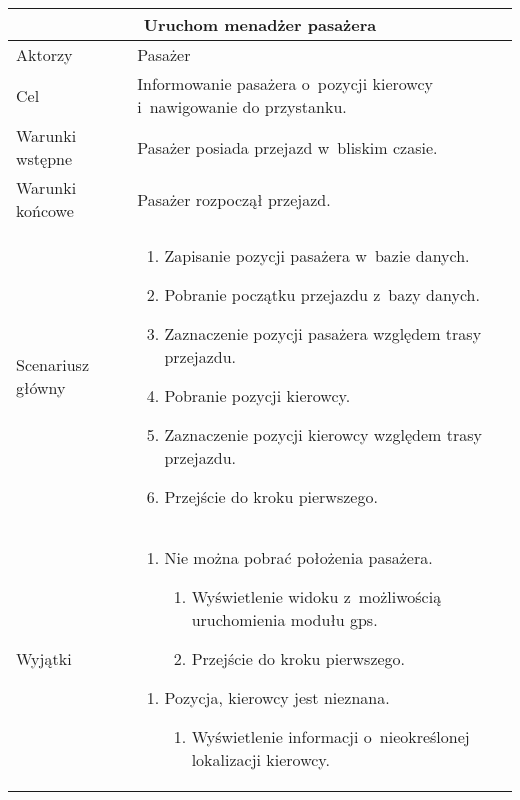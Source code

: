 \documentclass[eng,archivemode]{mgr}
\begin{document}
\newline
\vspace*{1 cm}
\newline
\begin{tabularx}{1\linewidth}{l|X}
	\multicolumn{2}{c}{\textbf{Uruchom menadżer pasażera}} \\ \hline
	Aktorzy & Pasażer\\ \hline
	Cel &  Informowanie pasażera o~pozycji kierowcy i~nawigowanie do przystanku. \\ \hline
	Warunki wstępne & Pasażer posiada przejazd w~bliskim czasie. \\ \hline
	Warunki końcowe & Pasażer rozpoczął przejazd.\\ \hline
	Scenariusz główny & 
	\begin{minipage}{4in}
		\vskip 4pt
		\begin{enumerate}
			\item Zapisanie pozycji pasażera w~bazie danych.
			\item Pobranie początku przejazdu z~bazy danych.
			\item Zaznaczenie pozycji pasażera względem trasy przejazdu.
			\item Pobranie pozycji kierowcy.
			\item Zaznaczenie pozycji kierowcy względem trasy przejazdu.
			\item Przejście do kroku pierwszego.
		\end{enumerate}
		\vskip 4pt
	\end{minipage}
	\\ \hline
	Wyjątki &
	\begin{minipage}{4in}
		\vskip 4pt
		\begin{enumerate}[label={1.\Alph*.},leftmargin=1.2cm]
			\item Nie można pobrać położenia pasażera.
			\begin{enumerate}[label=1.A.\arabic*.]
				\item Wyświetlenie widoku z~możliwością uruchomienia modułu gps.
				\item Przejście do kroku pierwszego.
			\end{enumerate}					
		\end{enumerate}
		\begin{enumerate}[label={4.\Alph*.},leftmargin=1.2cm]
			\item Pozycja, kierowcy jest nieznana.
			\begin{enumerate}[label=4.A.\arabic*.]
				\item Wyświetlenie informacji o~nieokreślonej lokalizacji kierowcy.

\end{enumerate}
\end{enumerate}
\end{minipage}
\end{tabularx}
\end{document}

